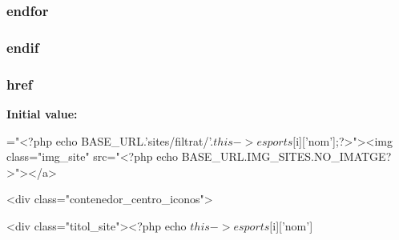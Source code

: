 \subsubsection[{endfor}]{ endfor}\label{app_2views_2esports_2index_8php_a3653f8507506e779e39b8b3cd0dde430}
\hypertarget{app_2views_2esports_2index_8php_a82cd33ca97ff99f2fcc5e9c81d65251b}{}
\subsubsection[{endif}]{\setlength{\rightskip}{0pt plus 5cm}endif}\label{app_2views_2esports_2index_8php_a82cd33ca97ff99f2fcc5e9c81d65251b}
\hypertarget{app_2views_2esports_2index_8php_aecfca4286e302d5d945be6fe76b99c86}{}
\subsubsection[{href}]{\setlength{\rightskip}{0pt plus 5cm}href}\label{app_2views_2esports_2index_8php_aecfca4286e302d5d945be6fe76b99c86}
{\bfseries Initial value\+:}
\begin{DoxyCode}
=\textcolor{stringliteral}{"<?php echo BASE\_URL.'sites/filtrat/'.$this->esports[$i]['nom'];?>"}><img \textcolor{keyword}{class}=\textcolor{stringliteral}{"img\_site"} src=\textcolor{stringliteral}{"<?php echo
       BASE\_URL.IMG\_SITES.NO\_IMATGE?>"}></a>
                            
                            <div \textcolor{keyword}{class}=\textcolor{stringliteral}{"contenedor\_centro\_iconos"}>
                                
                                <div \textcolor{keyword}{class}=\textcolor{stringliteral}{"titol\_site"}><?php echo $this->esports[$i][\textcolor{stringliteral}{'nom'}]
\end{DoxyCode}
